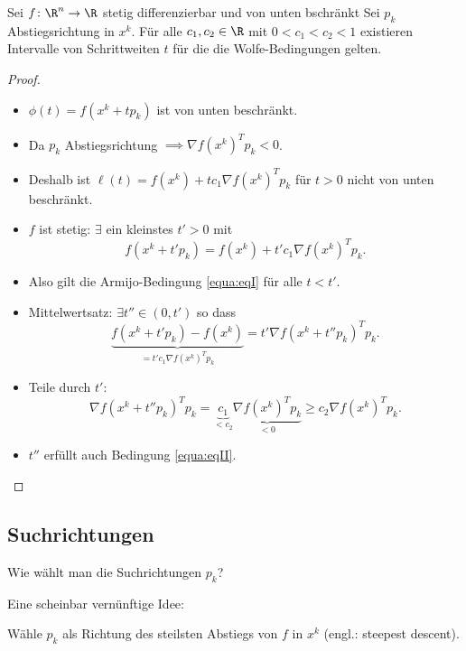 \begin{satz}
Sei $f \colon \R^n \to \R$ stetig differenzierbar und von unten bschränkt
Sei $p_k$ Abstiegsrichtung in $x^k$. Für alle $c_1,c_2 \in \R$ mit $0<c_1<c_2<1$ existieren
Intervalle von Schrittweiten $t$ für die die Wolfe-Bedingungen gelten.
\end{satz}
\begin{proof}
\begin{itemize}
 \item $\phi(t)=f (x^k+tp_k )$ ist von unten beschränkt.
 \item Da $p_k$ Abstiegsrichtung $\implies \nabla f (x^k )^Tp_k<0$.
 \item Deshalb ist $\ell (t)=f (x^k )+tc_1 \nabla f (x^k )^Tp_k$ für $t>0$ nicht von unten beschränkt.
 \item $f$ ist stetig: $\exists$ ein kleinstes $t'>0$ mit
  \begin{equation*}
   f (x^k+t'p_k )=f (x^k )+t'c_1 \nabla f (x^k )^Tp_k.
  \end{equation*}
 \item Also gilt die Armijo-Bedingung \eqref{equa:eqI} für alle $t<t'$.
 \item Mittelwertsatz: $\exists t'' \in (0,t' )$ so dass
  \begin{equation*}
   \underbrace{f (x^k+t'p_k )-f (x^k )}_{=t'c_1 \nabla f (x^k )^Tp_k}=t' \nabla f (x^k+t''p_k )^Tp_k.
  \end{equation*}
 \item Teile durch $t'$:
  \begin{equation*}
   \nabla f(x^k+t''p_k)^Tp_k=\underbrace{c_1}_{<c_2} \underbrace{\nabla f(x^k)^Tp_k}_{<0} \geq c_2 \nabla f(x^k)^Tp_k.
  \end{equation*}
 \item $t''$ erfüllt auch Bedingung \eqref{equa:eqII}. \qedhere
\end{itemize}
\end{proof}

\subsection{Suchrichtungen}

Wie wählt man die Suchrichtungen $p_k$?

Eine scheinbar vernünftige Idee:

Wähle $p_k$ als Richtung des steilsten Abstiegs von $f$ in $x^k$ (engl.: steepest descent).

